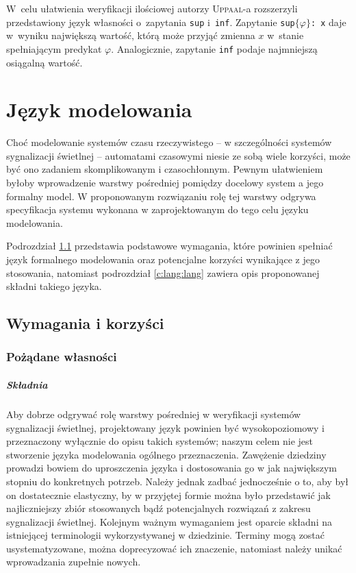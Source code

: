 \documentclass{pracamgr}
\newcommand{\upp}{\textsc{Uppaal}}
\theoremstyle{plain}
\begin{document}
W~celu ułatwienia weryfikacji ilościowej autorzy \upp-a rozszerzyli
przedstawiony język własności o~zapytania \texttt{sup} i~\texttt{inf}.
Zapytanie \texttt{sup$\{\varphi\}$: x} daje w~wyniku największą wartość,
którą może przyjąć zmienna $x$ w~stanie spełniającym predykat $\varphi$.
Analogicznie, zapytanie \texttt{inf} podaje najmniejszą osiągalną wartość.

\chapter{Język modelowania}

Choć modelowanie systemów czasu rzeczywistego -- w szczególności
systemów sygnalizacji świetlnej -- automatami czasowymi niesie ze sobą
wiele korzyści, może być ono zadaniem skomplikowanym i
czasochłonnym. Pewnym ułatwieniem byłoby wprowadzenie warstwy
pośredniej pomiędzy docelowy system a jego formalny model.  W
proponowanym rozwiązaniu rolę tej warstwy odgrywa specyfikacja systemu
wykonana w zaprojektowanym do tego celu języku modelowania.

Podrozdział \ref{c:lang:req} przedstawia podstawowe wymagania, które
powinien spełniać język formalnego modelowania oraz potencjalne
korzyści wynikające z jego stosowania, natomiast podrozdział
\ref{c:lang:lang} zawiera opis proponowanej składni takiego języka.

\section{Wymagania i korzyści}
\label{c:lang:req}

\subsection{Pożądane własności}

\paragraph{Składnia} Aby dobrze odgrywać rolę warstwy pośredniej w
weryfikacji systemów sygnalizacji świetlnej, projektowany język
powinien być wysokopoziomowy i przeznaczony wyłącznie do opisu takich
systemów; naszym celem nie jest stworzenie języka modelowania ogólnego
przeznaczenia. Zawężenie dziedziny prowadzi bowiem do uproszczenia
języka i dostosowania go w jak największym stopniu do konkretnych
potrzeb. Należy jednak zadbać jednocześnie o to, aby był on
dostatecznie elastyczny, by w przyjętej formie można było przedstawić
jak najliczniejszy zbiór stosowanych bądź potencjalnych rozwiązań z
zakresu sygnalizacji świetlnej. Kolejnym ważnym wymaganiem jest
oparcie składni na istniejącej terminologii wykorzystywanej w
dziedzinie. Terminy mogą zostać usystematyzowane, można doprecyzować
ich znaczenie, natomiast należy unikać wprowadzania zupełnie nowych.
\end{document}
